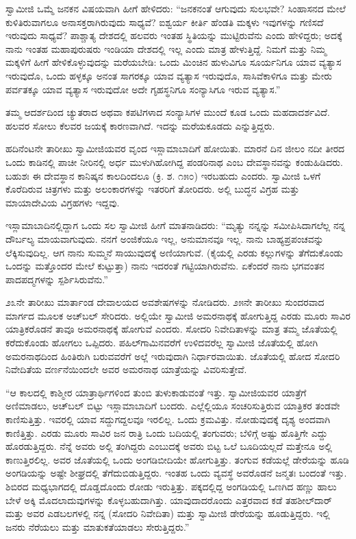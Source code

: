  ಸ್ವಾಮೀಜಿ ಒಮ್ಮೆ ಜನಕನ ವಿಷಯವಾಗಿ ಹೀಗೆ ಹೇಳಿದರು: “ಜನಕನಂತೆ ಆಗುವುದು ಸುಲಭವೇ? ಸಿಂಹಾಸನದ ಮೇಲೆ ಕುಳಿತಿರುವಾಗಲೂ ಅನಾಸಕ್ತರಾಗಿರುವುದು ಸಾಧ್ಯವೆ? ಐಶ್ವರ್ಯ ಕೀರ್ತಿ ಹೆಂಡತಿ ಮಕ್ಕಳು ಇವುಗಳನ್ನು ಗಣಿಸದೆ ಇರುವುದು ಸಾಧ್ಯವೆ? ಪಾಶ್ಚಾತ್ಯ ದೇಶದಲ್ಲಿ ಹಲವರು ಇಂತಹ ಸ್ಥಿತಿಯನ್ನು ಮುಟ್ಟಿರುವೆನು ಎಂದು ಹೇಳಿದ್ದರು; ಅದಕ್ಕೆ ನಾನು ಇಂತಹ ಮಹಾಪುರುಷರು ಇಂಡಿಯಾ ದೇಶದಲ್ಲಿ ಇಲ್ಲ ಎಂದು ಮಾತ್ರ ಹೇಳುತ್ತಿದ್ದೆ. ನಿಮಗೆ ಮತ್ತು ನಿಮ್ಮ ಮಕ್ಕಳಿಗೆ ಹೀಗೆ ಹೇಳಿಕೊಳ್ಳುವುದನ್ನು ಮರೆಯಬೇಡಿ: ಒಂದು ಮಿಂಚಿನ ಹುಳುವಿಗೂ ಸೂರ್ಯನಿಗೂ ಯಾವ ವ್ಯತ್ಯಾಸ ಇರುವುದೊ, ಒಂದು ಹಳ್ಳಕ್ಕೂ ಅನಂತ ಸಾಗರಕ್ಕೂ ಯಾವ ವ್ಯತ್ಯಾಸ ಇರುವುದೊ, ಸಾಸಿವೆಕಾಳಿಗೂ ಮತ್ತು ಮೇರು ಪರ್ವತಕ್ಕೂ ಯಾವ ವ್ಯತ್ಯಾಸ ಇರುವುದೋ ಅದೇ ಗೃಹಸ್ಥನಿಗೂ ಸಂನ್ಯಾಸಿಗೂ ಇರುವ ವ್ಯತ್ಯಾಸ.”‌ 

 ತಮ್ಮ ಆದರ್ಶದಿಂದ ಚ್ಯುತರಾದ ಅಥವಾ ಕಪಟಿಗಳಾದ ಸಂನ್ಯಾಸಿಗಳ ಮುಂದೆ ಕೂಡ ಒಂದು ಮಹದಾದರ್ಶವಿದೆ. ಹಲವರ ಸೋಲು ಕೆಲವರ ಜಯಕ್ಕೆ ಕಾರಣವಾಗಿದೆ. ಇದನ್ನು ಮರೆಯಕೂಡದು ಎನ್ನುತ್ತಿದ್ದರು. 

 ಹದಿನೆಂಟನೇ ತಾರೀಖು ಸ್ವಾಮೀಜಿಯವರ ವೃಂದ ಇಸ್ಲಾಮಾಬಾದಿಗೆ ಹೋಯಿತು. ಮಾರನೆ ದಿನ ಜೀಲಂ ನದೀ ತೀರದ ಒಂದು ಕಾಡಿನಲ್ಲಿ ಪಾಚೀ ನೀರಿನಲ್ಲಿ ಅರ್ಧ ಮುಳುಗಿಹೋಗಿದ್ದ ಪಂಡರಿನಾಥ ಎಂಬ ದೇವಸ್ಥಾನವನ್ನು ಕಂಡುಹಿಡಿದರು. ಬಹುಶಃ ಈ ದೇವಸ್ಥಾನ ಕಾನಿಷ್ಕನ ಕಾಲದಿಂದಲೂ (ಕ್ರಿ. ಶ. ೧೫೦) ಇರಬಹುದು ಎಂದರು. ಸ್ವಾಮೀಜಿ ಒಳಗೆ ಕೊರೆದಿರುವ ಚಿತ್ರಗಳು ಮತ್ತು ಅಲಂಕಾರಗಳನ್ನು ಇತರರಿಗೆ ತೋರಿದರು. ಅಲ್ಲಿ ಬುದ್ಧನ ವಿಗ್ರಹ ಮತ್ತು ಮಾಯಾದೇವಿಯ ವಿಗ್ರಹಗಳು ಇದ್ದವು. 

 ಇಸ್ಲಾಮಾಬಾದಿನಲ್ಲಿದ್ದಾಗ ಒಂದು ಸಲ ಸ್ವಾಮೀಜಿ ಹೀಗೆ ಮಾತನಾಡಿದರು: “ಮೃತ್ಯು ನನ್ನನ್ನು ಸಮೀಪಿಸಿದಾಗಲೆಲ್ಲ ನನ್ನ ದೌರ್ಬಲ್ಯ ಮಾಯವಾಗುವುದು. ನನಗೆ ಅಂಜಿಕೆಯೂ ಇಲ್ಲ, ಅನುಮಾನವೂ‌ ಇಲ್ಲ. ನಾನು ಬಾಹ್ಯಪ್ರಪಂಚವನ್ನು ಲೆಕ್ಕಿಸುವುದಿಲ್ಲ. ಆಗ ನಾನು ಸುಮ್ಮನೆ ಸಾಯುವುದಕ್ಕೆ ಅಣಿಯಾಗುವೆ. (ಕೈಯಲ್ಲಿ ಎರಡು ಕಲ್ಲುಗಳನ್ನು ತೆಗೆದುಕೊಂಡು ಒಂದನ್ನು ಮತ್ತೊಂದರ ಮೇಲೆ ಕುಟ್ಟುತ್ತಾ) ನಾನು ಇದರಂತೆ ಗಟ್ಟಿಯಾಗಿರುವೆನು. ಏಕೆಂದರೆ ನಾನು ಭಗವಂತನ ಪಾದಪದ್ಮಗಳನ್ನು ಸ್ಪರ್ಶಿಸಿರುವೆನು.” 

 ೨೩ನೇ ತಾರೀಖು ಮಾರ್ತಾಂಡ ದೇವಾಲಯದ ಅವಶೇಷಗಳನ್ನು ನೋಡಿದರು. ೨೫ನೇ ತಾರೀಖು ಸುಂದರವಾದ ಮಾರ್ಗದ ಮೂಲಕ ಅಚ್‍ಬಲ್ ಸೇರಿದರು. ಅಲ್ಲಿಯೇ ಸ್ವಾಮೀಜಿ ಅಮರನಾಥಕ್ಕೆ ಹೋಗುತ್ತಿದ್ದ ಎರಡು ಮೂರು ಸಾವಿರ ಯಾತ್ರಿಕರೊಡನೆ ತಾವೂ ಅಮರನಾಥಕ್ಕೆ ಹೋಗುವೆ ಎಂದರು. ಸೋದರಿ ನಿವೇದಿತಾಳನ್ನು ಮಾತ್ರ ತಮ್ಮ ಜೊತೆಯಲ್ಲಿ ಕರೆದುಕೊಂಡು ಹೋಗಲು ಒಪ್ಪಿದರು. ಪಹಿಲ್‍ಗಾಮಿನವರೆಗೆ ಉಳಿದವರೆಲ್ಲ ಸ್ವಾಮೀಜಿ ಜೊತೆಯಲ್ಲಿ ಹೋಗಿ ಅಮರನಾಥದಿಂದ ಹಿಂತಿರುಗಿ ಬರುವವರೆಗೆ ಅಲ್ಲೆ ಇರುವುದಾಗಿ ನಿರ್ಧಾರವಾಯಿತು. ಜೊತೆಯಲ್ಲಿ ಹೋದ ಸೋದರಿ ನಿವೇದಿತೆಯ ವರ್ಣನೆಯಿಂದಲೇ ಅವರ ಅಮರನಾಥ ಯಾತ್ರೆಯನ್ನು ವಿವರಿಸುತ್ತೇವೆ. 

 “ಆ ಕಾಲದಲ್ಲಿ ಕಾಶ್ಮೀರ ಯಾತ್ರಾರ್ಥಿಗಳಿಂದ ತುಂಬಿ ತುಳುಕಾಡುವಂತೆ ಇತ್ತು. ಸ್ವಾಮೀಜಿಯವರ ಯಾತ್ರೆಗೆ ಅಣಿಮಾಡಲು, ಅಚ್‍ಬಲ್ ಬಿಟ್ಟು ಇಸ್ಲಾಮಾಬಾದಿಗೆ ಬಂದರು. ಎಲ್ಲೆಲ್ಲಿಯೂ ಸಂಚರಿಸುತ್ತಿರುವ ಯಾತ್ರಿಕರ ತಂಡವೇ ಕಾಣಿಸುತ್ತಿತ್ತು. ಇವರಲ್ಲಿ ಯಾವ ಸದ್ದುಗದ್ದಲವೂ ಇರಲಿಲ್ಲ. ಒಂದು ಕ್ರಮವಿತ್ತು. ನೋಡುವುದಕ್ಕೆ ದೃಶ್ಯ ಅಂದವಾಗಿ ಕಾಣಿತ್ತಿತ್ತು. ಎರಡು ಮೂರು ಸಾವಿರ ಜನ ರಾತ್ರಿ ಒಂದು ಬದಿಯಲ್ಲಿ ತಂಗುವರು; ಬೆಳಿಗ್ಗೆ ಅಷ್ಟು ಹೊತ್ತಿಗೇ ಎದ್ದು ಹೊರಡುತ್ತಿದ್ದರು. ನೆನ್ನೆ ಅವರು ಅಲ್ಲಿ ತಂಗಿದ್ದರು ಎಂಬುದಕ್ಕೆ ಅವರು ಬಿಟ್ಟ ಒಲೆ ಬೂದಿಯಲ್ಲದೆ ಮತ್ತೇನೂ ಅಲ್ಲಿ ಕಾಣುತ್ತಿರಲಿಲ್ಲ. ಅವರ ಜೊತೆಯಲ್ಲಿ ಒಂದು ಅಂಗಡಿಬೀದಿಯೇ ಹೋಗುತ್ತಿತ್ತು. ತಂಗುವ ಕಡೆಯಲ್ಲೆ ಡೇರೆಯನ್ನು ಹೂಡಿ ಅಂಗಡಿಯನ್ನು ಅಷ್ಟೇ ಶೀಘ್ರದಲ್ಲಿ ತೆಗೆದುಬಿಡುತ್ತಿದ್ದರು. ಇಂತಹ ಒಂದು ವ್ಯವಸ್ಥೆ ಅವರೊಡನೆ ಜನ್ಮತಃ ಬಂದಂತೆ ಇತ್ತು. ಶಿಬಿರದ ಮಧ್ಯಭಾಗದಲ್ಲಿ ದೊಡ್ಡದೊಂದು ರೋಡು ಇರುತ್ತಿತ್ತು. ಪಕ್ಕದಲ್ಲಿದ್ದ ಅಂಗಡಿಯಲ್ಲಿ ಒಣಗಿದ ಹಣ್ಣು ಹಾಲು ಬೇಳೆ ಅಕ್ಕಿ ಮೊದಲಾದುವುಗಳನ್ನು ಕೊಳ್ಳಬಹುದಾಗಿತ್ತು. ಯಾವುದಾದರೊಂದು ಎತ್ತರವಾದ ಕಡೆ ತಹಶೀಲ್‍ದಾರ್ ಮತ್ತು ಅವರ ಎಡಬಲಗಳಲ್ಲಿ ನನ್ನ (ಸೋದರಿ ನಿವೇದಿತಾ) ಮತ್ತು ಸ್ವಾಮೀಜಿ ಡೇರೆಯನ್ನು ಹೂಡುತ್ತಿದ್ದರು. ಇಲ್ಲಿ ಜನರು ನೆರೆಯಲು ಮತ್ತು ಮಾತುಕತೆಯಾಡಲು ಸೇರುತ್ತಿದ್ದರು.” 

